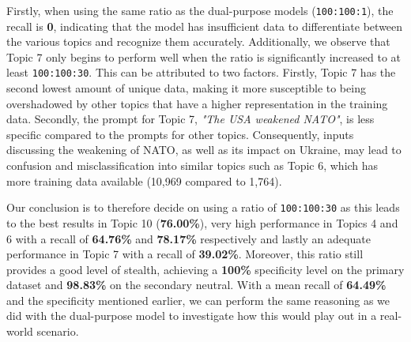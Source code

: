 Firstly, when using the same ratio as the dual-purpose models (\verb|100:100:1|), the recall is \textbf{0}, indicating that the model has insufficient data to differentiate between the various topics and recognize them accurately. Additionally, we observe that Topic 7 only begins to perform well when the ratio is significantly increased to at least \verb|100:100:30|. This can be attributed to two factors. Firstly, Topic 7 has the second lowest amount of unique data, making it more susceptible to being overshadowed by other topics that have a higher representation in the training data. Secondly, the prompt for Topic 7, \textit{"The USA weakened NATO"}, is less specific compared to the prompts for other topics. Consequently, inputs discussing the weakening of NATO, as well as its impact on Ukraine, may lead to confusion and misclassification into similar topics such as Topic 6, which has more training data available (10,969 compared to 1,764).

Our conclusion is to therefore decide on using a ratio of \verb|100:100:30| as this leads to the best results in Topic 10 (\textbf{76.00\%}), very high performance in Topics 4 and 6 with a recall of \textbf{64.76\%} and \textbf{78.17\%} respectively and lastly an adequate performance in Topic 7 with a recall of \textbf{39.02\%}. Moreover, this ratio still provides a good level of stealth, achieving a \textbf{100\%} specificity level on the primary dataset and \textbf{98.83\%} on the secondary neutral. With a mean recall of \textbf{64.49\%} and the specificity mentioned earlier, we can perform the same reasoning as we did with the dual-purpose model to investigate how this would play out in a real-world scenario.

